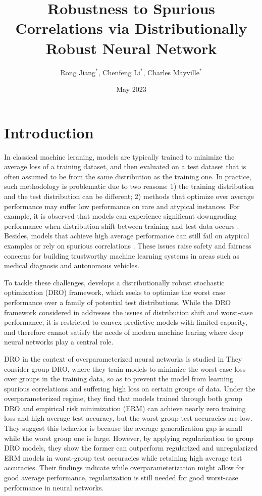 \documentclass{article}
\title{Robustness to Spurious Correlations via Distributionally Robust Neural Network}
\author{Rong Jiang$^*$, Chenfeng Li$^*$, Charles Mayville$^*$}
\date{May 2023}
\begin{document}
\maketitle
\def\thefootnote{*}\def\thefootnote{\arabic{footnote}}

\section{Introduction}
In classical machine leraning, models are typically trained to minimize the average loss of a training dataset, and then evaluated on a test dataset that is often assumed to be from the same distribution as the training one. In practice, such methodology is problematic due to two reasons: 1) the training distribution and the test distribution can be different; 2) methods that optimize over average performance may suffer low performance on rare and atypical instances. For example, it is observed that models can experience significant downgrading performance when distribution shift between training and test data occurs \cite{ds}. Besides, models that achieve high average performance can still fail on atypical examples or rely on spurious correlations \cite{atypical}. These issues raise safety and fairness concerns for building trustworthy machine learning systems in areas such as medical diagnosis and autonomous vehicles.

To tackle these challenges, \cite{duchi} develops a distributionally robust
stochastic optimization (DRO) framework, which seeks to optimize the worst case performance over a family of potential test distributions. While the DRO framework considered in \cite{duchi} addresses the issues of distribution shift and worst-case performance, it is restricted to convex predictive models with limited capacity, and therefore cannot satisfy the needs of modern machine learing where deep neural networks play a central role.

DRO in the context of overparameterized neural networks is studied in \cite{groupdro} They consider group DRO, where they
train models to minimize the worst-case loss over groups in the training
data, so as to prevent the model from learning spurious correlations and suffering high loss on certain
groups of data. Under the overparameterized regime, they find that models trained through both group DRO and empirical risk minimization (ERM) can achieve nearly zero training loss and high average test accuracy, but the worst-group test accuracies are low. They suggest this behavior is because the average generalization gap is small while the worst group one is large. However, by applying regularization to group DRO models, they show the former can outperform regularized and unregularized ERM models in worst-group test accuracies while retaining high average test accuracies. Their findings indicate while overparameterization might allow for good average performance, regularization is still needed for good worst-case performance in neural networks.
\end{document}
